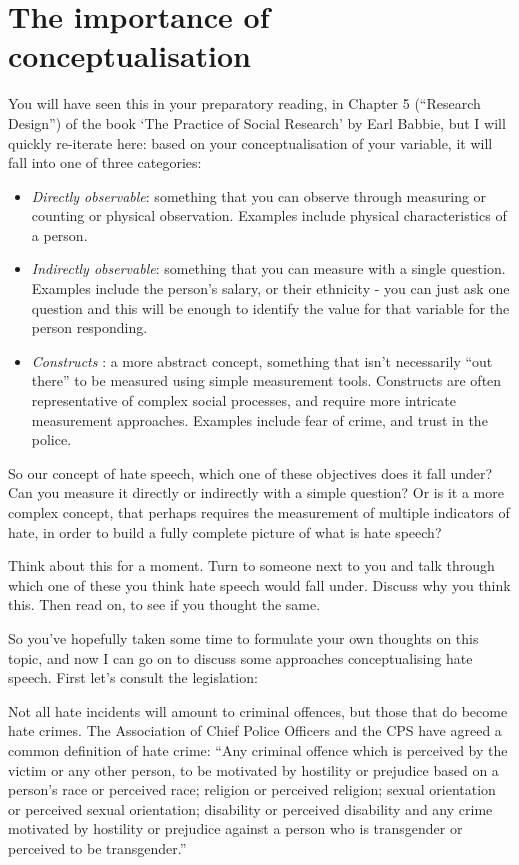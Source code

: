 \documentclass[]{book}
\providecommand{\tightlist}{%
  \setlength{\itemsep}{0pt}\setlength{\parskip}{0pt}}
\theoremstyle{definition}
\theoremstyle{definition}
\theoremstyle{definition}
\theoremstyle{remark}
\begin{document}
\hypertarget{the-importance-of-conceptualisation}{%
\section{The importance of
conceptualisation}\label{the-importance-of-conceptualisation}}

You will have seen this in your preparatory reading, in Chapter 5
(``Research Design'') of the book `The Practice of Social Research' by
Earl Babbie, but I will quickly re-iterate here: based on your
conceptualisation of your variable, it will fall into one of three
categories:

\begin{itemize}
\tightlist
\item
  \emph{Directly observable}: something that you can observe through
  measuring or counting or physical observation. Examples include
  physical characteristics of a person.
\item
  \emph{Indirectly observable}: something that you can measure with a
  single question. Examples include the person's salary, or their
  ethnicity - you can just ask one question and this will be enough to
  identify the value for that variable for the person responding.
\item
  \emph{Constructs} : a more abstract concept, something that isn't
  necessarily ``out there'' to be measured using simple measurement
  tools. Constructs are often representative of complex social
  processes, and require more intricate measurement approaches. Examples
  include fear of crime, and trust in the police.
\end{itemize}

So our concept of hate speech, which one of these objectives does it
fall under? Can you measure it directly or indirectly with a simple
question? Or is it a more complex concept, that perhaps requires the
measurement of multiple indicators of hate, in order to build a fully
complete picture of what is hate speech?

Think about this for a moment. Turn to someone next to you and talk
through which one of these you think hate speech would fall under.
Discuss why you think this. Then read on, to see if you thought the
same.

So you've hopefully taken some time to formulate your own thoughts on
this topic, and now I can go on to discuss some approaches
conceptualising hate speech. First let's consult the legislation:

Not all hate incidents will amount to criminal offences, but those that
do become hate crimes. The Association of Chief Police Officers and the
CPS have agreed a common definition of hate crime: ``Any criminal
offence which is perceived by the victim or any other person, to be
motivated by hostility or prejudice based on a person's race or
perceived race; religion or perceived religion; sexual orientation or
perceived sexual orientation; disability or perceived disability and any
crime motivated by hostility or prejudice against a person who is
transgender or perceived to be transgender.''
\end{document}
